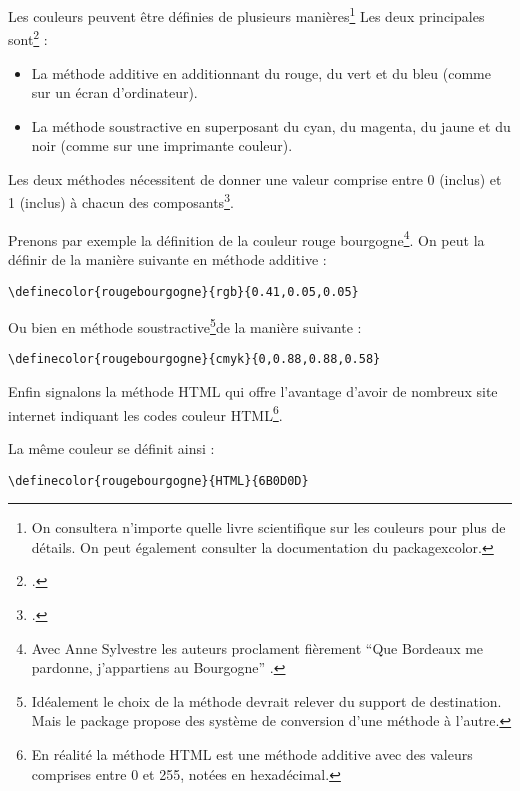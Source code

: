 Les couleurs peuvent être définies de plusieurs manières\footnote{On consultera n'importe quelle livre scientifique sur les couleurs pour plus de détails. On peut également consulter la documentation du package{xcolor}.} Les deux principales sont\footcite[Il existe aussi la méthode de définition par la longueur d'onde pour les couleurs de l'arc en ciel, par pourcentage de gris pour les différents niveaux de gris, ainsi que par teinte, saturation et luminosité, mais ceci nécessiterait un cours de physique lumineuse. Pour  les personnes intéressées par les détails, consulter][]{xcolor_methode} :
\begin{itemize}
\item La méthode additive en additionnant du rouge, du vert et du bleu (comme sur un écran d'ordinateur).
\item La méthode soustractive en superposant du cyan, du magenta, du jaune et du noir (comme sur une imprimante couleur).
\end{itemize}


Les deux méthodes nécessitent de donner une valeur comprise entre 0 (inclus) et 1 (inclus) à chacun des composants\footcite[On pourra trouver une série de code couleur sur le site][]{codecouleur}.



Prenons par exemple la définition de la couleur \textcolor{rougebourgogne}{rouge bourgogne}\footnote{Avec Anne Sylvestre les auteurs proclament fièrement \enquote{Que Bordeaux me pardonne, j’appartiens au Bourgogne} \parencite{romaneconti}.}.
On peut la définir de la manière suivante en méthode additive :
\begin{verbatim}
\definecolor{rougebourgogne}{rgb}{0.41,0.05,0.05}
\end{verbatim}

Ou bien en méthode soustractive\footnote{Idéalement le choix de  la méthode devrait relever du support de destination. Mais le package  propose des système de conversion d'une méthode à l'autre.}de la manière suivante :
\begin{verbatim}
\definecolor{rougebourgogne}{cmyk}{0,0.88,0.88,0.58}
\end{verbatim}

Enfin signalons la méthode HTML qui offre l'avantage d'avoir de nombreux site internet indiquant les codes couleur HTML\footnote{En réalité la méthode HTML est une méthode additive avec des valeurs comprises entre 0 et 255, notées en hexadécimal.}.

La même couleur se définit ainsi :

\begin{verbatim}
\definecolor{rougebourgogne}{HTML}{6B0D0D}
\end{verbatim}




